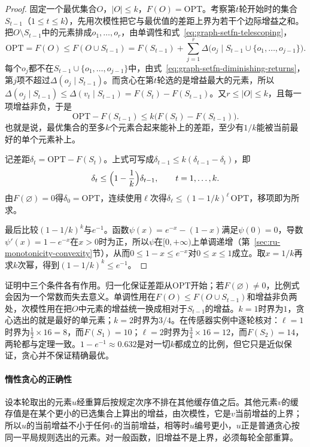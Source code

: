 \begin{proof}
固定一个最优集合$O$，$|O|\leq k$，$F(O)=\mathrm{OPT}$。考察第$t$轮开始时的集合$S_{t-1}$（$1\leq t\leq k$），先用次模性把它与最优值的差距上界为若干个边际增益之和。把$O\setminus S_{t-1}$中的元素排成$o_1,\ldots,o_r$，由单调性和式~\eqref{eq:graph-setfn-telescoping}，
\[
  \mathrm{OPT}=F(O)\leq F(O\cup S_{t-1})
  =F(S_{t-1})+\sum_{j=1}^{r}\Delta\bigl(o_j\mid S_{t-1}\cup\{o_1,\ldots,o_{j-1}\}\bigr).
\]
每个$o_j$都不在$S_{t-1}\cup\{o_1,\ldots,o_{j-1}\}$中，由式~\eqref{eq:graph-setfn-diminishing-returns}，第$j$项不超过$\Delta(o_j\mid S_{t-1})$。而贪心在第$t$轮选的是增益最大的元素，所以$\Delta(o_j\mid S_{t-1})\leq\Delta(v_t\mid S_{t-1})=F(S_t)-F(S_{t-1})$。又$r\leq|O|\leq k$，且每一项增益非负，于是
\[
  \mathrm{OPT}-F(S_{t-1})\leq k\bigl(F(S_t)-F(S_{t-1})\bigr).
\]
也就是说，最优集合的至多$k$个元素合起来能补上的差距，至少有$1/k$能被当前最好的单个元素补上。

记差距$\delta_t=\mathrm{OPT}-F(S_t)$。上式可写成$\delta_{t-1}\leq k(\delta_{t-1}-\delta_t)$，即
\[
  \delta_t\leq\Bigl(1-\frac1k\Bigr)\delta_{t-1},\qquad t=1,\ldots,k.
\]
由$F(\varnothing)=0$得$\delta_0=\mathrm{OPT}$，连续使用$\ell$次得$\delta_\ell\leq(1-1/k)^\ell\,\mathrm{OPT}$，移项即为所求。

最后比较$(1-1/k)^k$与$e^{-1}$。函数$\psi(x)=e^{-x}-(1-x)$满足$\psi(0)=0$，导数$\psi'(x)=1-e^{-x}$在$x>0$时为正，所以$\psi$在$[0,+\infty)$上单调递增（第~\ref{sec:ru-monotonicity-convexity}节），从而$0\leq1-x\leq e^{-x}$对$0\leq x\leq1$成立。取$x=1/k$再求$k$次幂，得到$(1-1/k)^k\leq e^{-1}$。
\end{proof}

证明中三个条件各有作用。归一化保证差距从$\mathrm{OPT}$开始；若$F(\varnothing)\neq0$，比例式会因为一个常数而失去意义。单调性用在$F(O)\leq F(O\cup S_{t-1})$和增益非负两处，次模性用在把$O$中元素的增益统一换成相对于$S_{t-1}$的增益。$k=1$时界为$1$，贪心选出的就是最好的单元素；$k=2$时界为$3/4$。在传感器实例中逐轮核对：$\ell=1$时界为$\frac12\times16=8$，而$F(S_1)=10$；$\ell=2$时界为$\frac34\times16=12$，而$F(S_2)=14$，两轮都与定理一致。$1-e^{-1}\approx0.632$是对一切$k$都成立的比例，但它只是近似保证，贪心并不保证精确最优。

\paragraph{惰性贪心的正确性}
设本轮取出的元素$u$经重算后按规定次序不排在其他缓存值之后。其他元素$v$的缓存值是在某个更小的已选集合上算出的增益，由次模性，它是$v$当前增益的上界；所以$u$的当前增益不小于任何$v$的当前增益，相等时$u$编号更小，$u$正是普通贪心按同一平局规则选出的元素。对一般函数，旧增益不是上界，必须每轮全部重算。

